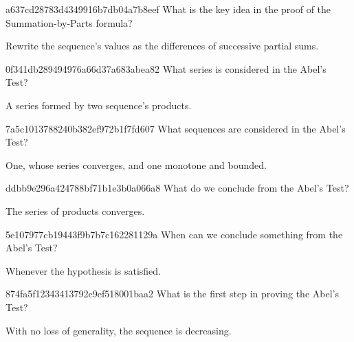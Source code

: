 \begin{note}{a637cd28783d4349916b7db04a7b8eef}
    What is the key idea in the proof of the Summation-by-Parts formula?

    \begin{cloze}{1}
        Rewrite the sequence's values as the differences of successive partial sums.
    \end{cloze}
\end{note}

\begin{note}{0f341db289494976a66d37a683abea82}
    What series is considered in the Abel's Test?

    \begin{cloze}{1}
        A series formed by two sequence's products.
    \end{cloze}
\end{note}

\begin{note}{7a5c1013788240b382ef972b1f7fd607}
    What sequences are considered in the Abel's Test?

    \begin{cloze}{1}
        One, whose series converges, and one monotone and bounded.
    \end{cloze}
\end{note}

\begin{note}{ddbb9e296a424788bf71b1e3b0a066a8}
    What do we conclude from the Abel's Test?

    \begin{cloze}{1}
        The series of products converges.
    \end{cloze}
\end{note}

\begin{note}{5e107977cb19443f9b7b7c162281129a}
    When can we conclude something from the Abel's Test?

    \begin{cloze}{1}
        Whenever the hypothesis is satisfied.
    \end{cloze}
\end{note}

\begin{note}{874fa5f12343413792c9ef518001baa2}
    What is the first step in proving the Abel's Test?

    \begin{cloze}{1}
        With no loss of generality, the sequence is decreasing.
    \end{cloze}
\end{note}

